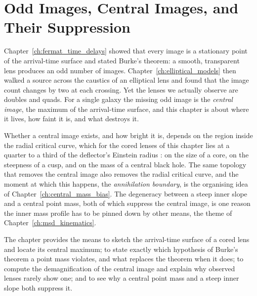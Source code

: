 
\chapter{Odd Images, Central Images, and Their Suppression}
\label{ch:odd_images}

\noindent
Chapter~\ref{ch:fermat_time_delays} showed that every image is a
stationary point of the arrival-time surface and stated Burke's
theorem: a smooth, transparent lens produces an odd number of images.
Chapter~\ref{ch:elliptical_models} then walked a source across the
caustics of an elliptical lens and found that the image count changes
by two at each crossing.  Yet the lenses we actually observe are
doubles and quads.  For a single galaxy the missing odd image is the
\emph{central image},
the maximum of the arrival-time surface, and this chapter is about
where it lives, how faint it is, and what destroys it.

Whether a central image exists, and how bright it is, depends on the
region inside the radial critical curve, which for the cored lenses of
this chapter lies at a quarter to a third of the deflector's Einstein
radius : on the size of a core, on the steepness of a cusp, and
on the mass of a central black hole.  The same topology that removes
the central image also removes the radial critical curve, and the
moment at which this happens, the \emph{annihilation boundary},
is the organising idea of Chapter~\ref{ch:central_mass_bias}.  The
degeneracy between a steep inner slope and a central point mass, both
of which suppress the central image, is one reason the inner mass
profile has to be pinned down by other means, the theme of
Chapter~\ref{ch:msd_kinematics}.

The chapter provides the means to sketch the arrival-time surface of a
cored lens and locate its central maximum; to state exactly which
hypothesis of Burke's theorem a point mass violates, and what replaces
the theorem when it does; to compute the demagnification of the central
image and explain why observed lenses rarely show one; and to see why a
central point mass and a steep inner slope both suppress it.

